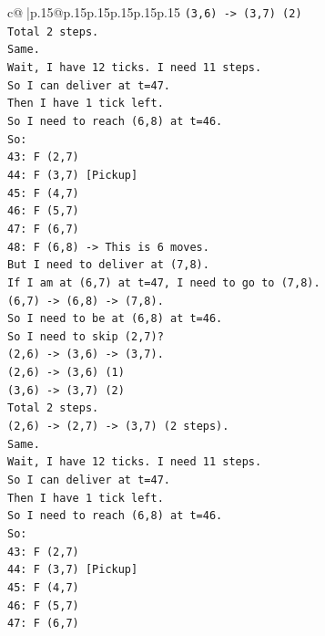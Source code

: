 \documentclass{article}
\begin{document}
{\begin{supertabular}{c@{$\;$}|p{.15\linewidth}@{}p{.15\linewidth}p{.15\linewidth}p{.15\linewidth}p{.15\linewidth}p{.15\linewidth}}
{{{\texttt{(3,6) {-}> (3,7) (2)} \\
\texttt{Total 2 steps.} \\
\texttt{Same.} \\
\texttt{Wait, I have 12 ticks. I need 11 steps.} \\
\texttt{So I can deliver at t=47.} \\
\texttt{Then I have 1 tick left.} \\
\texttt{So I need to reach (6,8) at t=46.} \\
\texttt{So:} \\
\texttt{43: F (2,7)} \\
\texttt{44: F (3,7) {[}Pickup{]}} \\
\texttt{45: F (4,7)} \\
\texttt{46: F (5,7)} \\
\texttt{47: F (6,7)} \\
\texttt{48: F (6,8) {-}> This is 6 moves.} \\
\texttt{But I need to deliver at (7,8).} \\
\texttt{If I am at (6,7) at t=47, I need to go to (7,8).} \\
\texttt{(6,7) {-}> (6,8) {-}> (7,8).} \\
\texttt{So I need to be at (6,8) at t=46.} \\
\texttt{So I need to skip (2,7)?} \\
\texttt{(2,6) {-}> (3,6) {-}> (3,7).} \\
\texttt{(2,6) {-}> (3,6) (1)} \\
\texttt{(3,6) {-}> (3,7) (2)} \\
\texttt{Total 2 steps.} \\
\texttt{(2,6) {-}> (2,7) {-}> (3,7) (2 steps).} \\
\texttt{Same.} \\
\texttt{Wait, I have 12 ticks. I need 11 steps.} \\
\texttt{So I can deliver at t=47.} \\
\texttt{Then I have 1 tick left.} \\
\texttt{So I need to reach (6,8) at t=46.} \\
\texttt{So:} \\
\texttt{43: F (2,7)} \\
\texttt{44: F (3,7) {[}Pickup{]}} \\
\texttt{45: F (4,7)} \\
\texttt{46: F (5,7)} \\
\texttt{47: F (6,7)} \\
}}}
\end{supertabular}}
\end{document}
